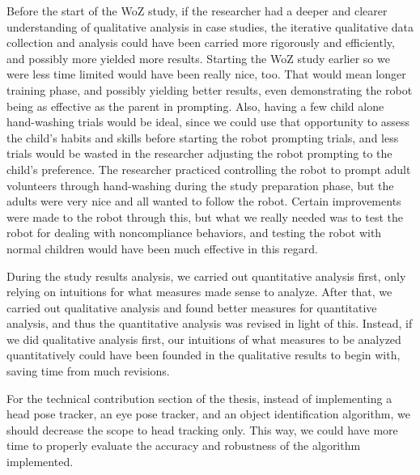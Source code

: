 Before the start of the WoZ study, if the researcher had a deeper and clearer understanding of qualitative analysis in case studies, the iterative qualitative data collection and analysis could have been carried more rigorously and efficiently, and possibly more yielded more results.  Starting the WoZ study earlier so we were less time limited would have been really nice, too.  That would mean longer training phase, and possibly yielding better results, even demonstrating the robot being as effective as the parent in prompting.  Also, having a few child alone hand-washing trials would be ideal, since we could use that opportunity to assess the child's habits and skills before starting the robot prompting trials, and less trials would be wasted in the researcher adjusting the robot prompting to the child's preference.  The researcher practiced controlling the robot to prompt adult volunteers through hand-washing during the study preparation phase, but the adults were very nice and all wanted to follow the robot.  Certain improvements were made to the robot through this, but what we really needed was to test the robot for dealing with noncompliance behaviors, and testing the robot with normal children would have been much effective in this regard.

During the study results analysis, we carried out quantitative analysis first, only relying on intuitions for what measures made sense to analyze.  After that, we carried out qualitative analysis and found better measures for quantitative analysis, and thus the quantitative analysis was revised in light of this.  Instead, if we did qualitative analysis first, our intuitions of what measures to be analyzed quantitatively could have been founded in the qualitative results to begin with, saving time from much revisions.

For the technical contribution section of the thesis, instead of implementing a head pose tracker, an eye pose tracker, and an object identification algorithm, we should decrease the scope to head tracking only.  This way, we could have more time to properly evaluate the accuracy and robustness of the algorithm implemented.